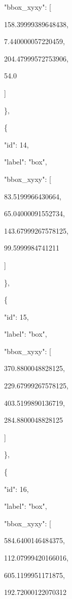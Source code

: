\documentclass[10pt,a4paper]{article}
\begin{document}
      "bbox\_xyxy":\allowbreak{} [\par
        158.39999389648438,\allowbreak{}\par
        7.440000057220459,\allowbreak{}\par
        204.47999572753906,\allowbreak{}\par
        54.0\par
      ]\par
    \},\allowbreak{}\par
    \{\par
      "id":\allowbreak{} 14,\allowbreak{}\par
      "label":\allowbreak{} "box",\allowbreak{}\par
      "bbox\_xyxy":\allowbreak{} [\par
        83.5199966430664,\allowbreak{}\par
        65.04000091552734,\allowbreak{}\par
        143.67999267578125,\allowbreak{}\par
        99.5999984741211\par
      ]\par
    \},\allowbreak{}\par
    \{\par
      "id":\allowbreak{} 15,\allowbreak{}\par
      "label":\allowbreak{} "box",\allowbreak{}\par
      "bbox\_xyxy":\allowbreak{} [\par
        370.8800048828125,\allowbreak{}\par
        229.67999267578125,\allowbreak{}\par
        403.5199890136719,\allowbreak{}\par
        284.8800048828125\par
      ]\par
    \},\allowbreak{}\par
    \{\par
      "id":\allowbreak{} 16,\allowbreak{}\par
      "label":\allowbreak{} "box",\allowbreak{}\par
      "bbox\_xyxy":\allowbreak{} [\par
        584.6400146484375,\allowbreak{}\par
        112.07999420166016,\allowbreak{}\par
        605.1199951171875,\allowbreak{}\par
        192.72000122070312\par
\end{document}
